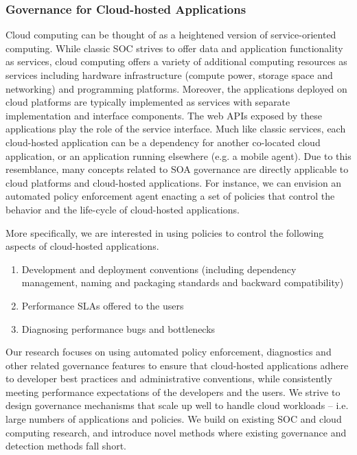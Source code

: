 \subsubsection{Governance for Cloud-hosted Applications}
Cloud computing can be thought of as a heightened version of service-oriented computing. While classic
SOC strives to offer data and application functionality as services, cloud computing offers a variety
of additional computing resources
as services including hardware infrastructure (compute power, storage space and networking) and programming
platforms. Moreover, the applications deployed on cloud platforms are typically implemented as services with
separate implementation and interface components. The web APIs exposed by these applications play the
role of the service interface.
Much like classic services, each cloud-hosted application 
can be a dependency for another
co-located cloud application, or an application running elsewhere (e.g. a mobile agent). 
Due to this resemblance, many concepts related to SOA governance are
directly applicable to cloud platforms and cloud-hosted applications. For instance, we can envision an 
automated policy enforcement agent enacting a 
set of policies that control the behavior and the life-cycle of cloud-hosted applications.

More specifically, we are interested in using policies to control the following aspects of cloud-hosted 
applications.
\begin{enumerate}
\item Development and deployment conventions (including dependency management, naming and packaging
standards and backward compatibility)
\item Performance SLAs offered to the users
\item Diagnosing performance bugs and bottlenecks
\end{enumerate}

Our research focuses on using automated policy enforcement, diagnostics and other related 
governance features to ensure that
cloud-hosted applications adhere to developer best practices and administrative conventions, while
consistently meeting performance expectations of the developers and the users. We strive to design
governance mechanisms that scale up well to handle cloud workloads -- i.e. large numbers of applications
and policies. We build on existing SOC and cloud computing research, and introduce novel methods
where existing governance and detection methods fall short. 